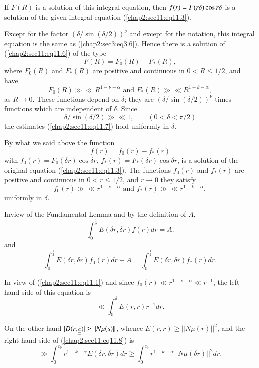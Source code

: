 \label{105}
If $F(R)$ is a solution of this integral equation, then $f(r) = F(r
\delta)\break\cos r \delta$ is a solution of the given integral equation
(\ref{chap2:sec11:eq11.3}). 

Except for the factor $(\delta /\sin (\delta/2))^\nu$ and except for the notation, this integral equation is the same as (\ref{chap2:sec3:eq3.6}). Hence there is a solution of (\ref{chap2:sec11:eq11.6}) of the type
$$
F(R) = F_{0}(R) - F_{*} (R),
$$
where $F_{0}(R)$ and $F_{*}(R)$ are positive and continuous in $0 < R \leq 1/2$, and have
\begin{equation*}
F_{0} (R) \gg \ll R^{1 - \nu - \alpha} \text{ and } F_{*}(R) \gg \ll R^{1-k-\alpha},\tag{11.7}\label{chap2:sec11:eq11.7}
\end{equation*}
as $R \to 0$. These functions depend on $\delta$; they are $(\delta /\sin (\delta/2))^{\nu}$ times functions which are independent of $\delta$. Since
$$
\delta / \sin (\delta/2) \gg \ll 1,\qquad (0 < \delta <\pi/2)
$$
the estimates (\ref{chap2:sec11:eq11.7}) hold uniformly in $\delta$.

By what we said above the function
$$
f(r) = f_{0}(r) - f_{*}(r)
$$
with $f_{0} (r) = F_{0} (\delta r) \cos \delta r$, $f_{*}(r) = F_{*}(\delta r) \cos \delta r$, is a solution of the original equation (\ref{chap2:sec11:eq11.3}). The functions $f_{0}(r)$ and $f_{*}(r)$ are positive and continuous in $0 < r \leq 1/2$, and $r \to 0$ they satisfy
$$
f_{0} (r) \gg \ll r^{1-\nu - \alpha} \text{ and } f_{*}(r) \gg \ll r^{1-k-\alpha},
$$
uniformly in $\delta$.

In\pageoriginale view of the Fundamental Lemma and by the definition of $A$,
\begin{equation*}
\int_{0}^{\frac{1}{2}} E(\delta r, \delta r) f(r) dr = A.
\end{equation*}
and 
\begin{equation*}
\int_{0}^{\frac{1}{2}} E(\delta r, \delta r) f_{0} (r) dr - A = \int_{0}^{\frac{1}{2}} E(\delta r, \delta r) f_{*} (r) dr.\tag{11.8}\label{chap2:sec11:eq11.8}
\end{equation*}

In view of (\ref{chap2:sec11:eq11.1}) and since $f_{0}(r) \ll r^{1 - \nu - \alpha} \ll r^{-1}$, the left hand side of this equation is
$$
\ll \int_{0}^{\delta} E(r, r) r^{-1} dr.
$$

On the other hand $|D(r, \underline{\underline{c}})| \geq ||N\mu(s)||$, whence $E(r, r) \geq ||N\mu(r)||^{2}$, and the right hand side of (\ref{chap2:sec11:eq11.8}) is
$$
\gg \int_{0}^{c_{9}} r^{1-k-\alpha} E(\delta r, \delta r) dr \geq \int_{0}^{c_{9}} r^{1-k-\alpha} ||N\mu(\delta r)||^{2} dr.
$$

